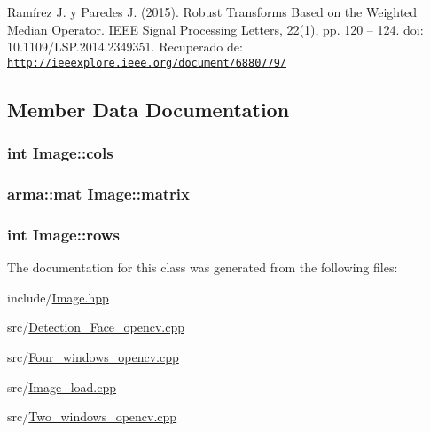 Ramírez J. y Paredes J. (2015). Robust Transforms Based on the Weighted Median Operator. IEEE Signal Processing Letters, 22(1), pp. 120 – 124. doi: 10.1109/LSP.2014.2349351. Recuperado de: \href{http://ieeexplore.ieee.org/document/6880779/}{\tt http://ieeexplore.ieee.org/document/6880779/} 

\subsection{Member Data Documentation}
\hypertarget{classImage_a9cef672ffec8e246ae8c34e8c64b57bf}{
\subsubsection[{cols}]{\setlength{\rightskip}{0pt plus 5cm}int {\bf Image::cols}}}
\label{classImage_a9cef672ffec8e246ae8c34e8c64b57bf}
\hypertarget{classImage_a9cfb2ad2bdb77e4da2f0cc4fef1f2cbb}{
\subsubsection[{matrix}]{\setlength{\rightskip}{0pt plus 5cm}arma::mat {\bf Image::matrix}}}
\label{classImage_a9cfb2ad2bdb77e4da2f0cc4fef1f2cbb}
\hypertarget{classImage_a3419545b62d16431c2ecdae5c8c5f91f}{
\subsubsection[{rows}]{\setlength{\rightskip}{0pt plus 5cm}int {\bf Image::rows}}}
\label{classImage_a3419545b62d16431c2ecdae5c8c5f91f}


The documentation for this class was generated from the following files:\begin{DoxyCompactItemize}
\item 
include/\hyperlink{Image_8hpp}{Image.hpp}\item 
src/\hyperlink{Detection__Face__opencv_8cpp}{Detection\_\-Face\_\-opencv.cpp}\item 
src/\hyperlink{Four__windows__opencv_8cpp}{Four\_\-windows\_\-opencv.cpp}\item 
src/\hyperlink{Image__load_8cpp}{Image\_\-load.cpp}\item 
src/\hyperlink{Two__windows__opencv_8cpp}{Two\_\-windows\_\-opencv.cpp}\end{DoxyCompactItemize}
